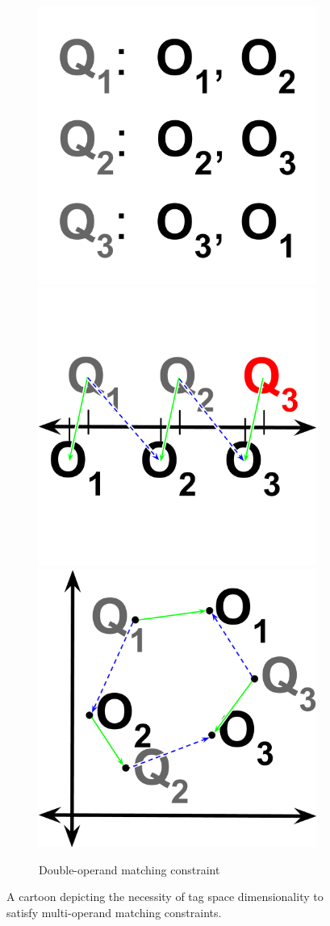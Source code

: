 \begin{figure}
\begin{center}
\begin{subfigure}[b]{\columnwidth}
\centering
\includegraphics[width=0.33\columnwidth]{img/1d-2d-single-double/double}%
\includegraphics[width=0.33\columnwidth]{img/1d-2d-single-double/1d-double}%
\includegraphics[width=0.33\columnwidth]{img/1d-2d-single-double/2d-double}
\caption{
Double-operand matching constraint
}
\label{fig:double}
\end{subfigure}

\caption{
A cartoon depicting the necessity of tag space dimensionality to satisfy multi-operand matching constraints.
}
\label{fig:1d_2d_single_double}

\end{center}
\end{figure}
